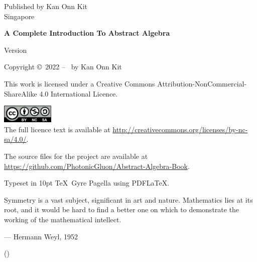 \clearpage\null\vfill
\thispagestyle{empty}
\begin{minipage}[b]{0.9\textwidth}
    \footnotesize\raggedright
    \setlength{\parskip}{0.5\baselineskip}

    Published by Kan Onn Kit\\
    Singapore
    \vspace{5cm}

    \textbf{A Complete Introduction To Abstract Algebra}\par
    Version \version
    \vspace{0.3cm}

    Copyright \copyright \ 2022 -- \the\year\ by Kan Onn Kit\par
    This work is licensed under a
    Creative Commons Attribution-NonCommercial-ShareAlike 4.0 International Licence.\par
    \includegraphics[width=2.5cm]{images/CC_BY-NC-SA_4.0.png}\\
    The full licence text is available at \url{http://creativecommons.org/licenses/by-nc-sa/4.0/}.\par    
    The source files for the project are available at \url{https://github.com/PhotonicGluon/Abstract-Algebra-Book}.
    \vspace{0.3cm}

    Typeset in 10pt \TeX~Gyre Pagella using PDF\LaTeX.
\end{minipage}

\vspace*{2\baselineskip}
\cleardoublepage

\thispagestyle{empty}
\vspace*{2cm}

\begin{center}
    \Large{\parbox{10cm}{
        \begin{raggedright}
            \Large
            Symmetry is a vast subject, significant in art and nature. Mathematics lies at its root, and it would be hard to find a better one on which to demonstrate the working of the mathematical intellect.
            \vspace{0.3cm}
            
            \hfill
            --- Hermann Weyl, 1952\\
            \vspace{-0.25cm}
            
            \hfill
            \normalsize
            ({\cite[p.~145]{weyl_1952}})
        \end{raggedright}
    }
}
\end{center}

